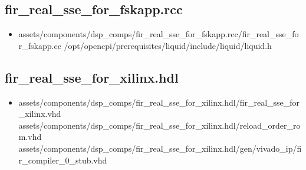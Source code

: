 \documentclass{article}
\begin{document}
\subsection*{fir\_real\_sse\_for\_fskapp.rcc}
\begin{itemize}
	\item assets/components/dsp\_comps/fir\_real\_sse\_for\_fskapp.rcc/fir\_real\_sse\_for\_fskapp.cc
	      \subitem /opt/opencpi/prerequisites/liquid/include/liquid/liquid.h
	       
\end{itemize}
\subsection*{fir\_real\_sse\_for\_xilinx.hdl}
\begin{itemize}
	\item assets/components/dsp\_comps/fir\_real\_sse\_for\_xilinx.hdl/fir\_real\_sse\_for\_xilinx.vhd
		\subitem assets/components/dsp\_comps/fir\_real\_sse\_for\_xilinx.hdl/reload\_order\_rom.vhd
		\subitem assets/components/dsp\_comps/fir\_real\_sse\_for\_xilinx.hdl/gen/vivado\_ip/fir\_compiler\_0\_stub.vhd
          
\end{itemize}
\end{document}
